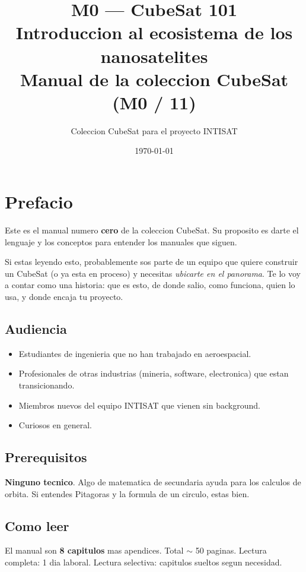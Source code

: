 \documentclass[11pt,a4paper,oneside,openright]{book}
\title{\Huge\bfseries M0 --- CubeSat 101\\[0.4em]
\Large Introduccion al ecosistema de los nanosatelites\\[0.6em]
\large Manual de la coleccion CubeSat (M0 / 11)}
\author{Coleccion CubeSat para el proyecto INTISAT}
\date{\today}
\begin{document}
\frontmatter
\maketitle

\chapter*{Prefacio}

Este es el manual numero \textbf{cero} de la coleccion CubeSat. Su
proposito es darte el lenguaje y los conceptos para entender los manuales
que siguen.

Si estas leyendo esto, probablemente sos parte de un equipo que quiere
construir un CubeSat (o ya esta en proceso) y necesitas \emph{ubicarte en
el panorama}. Te lo voy a contar como una historia: que es esto, de donde
salio, como funciona, quien lo usa, y donde encaja tu proyecto.

\section*{Audiencia}

\begin{itemize}[leftmargin=2em]
  \item Estudiantes de ingenieria que no han trabajado en aeroespacial.
  \item Profesionales de otras industrias (mineria, software, electronica)
        que estan transicionando.
  \item Miembros nuevos del equipo INTISAT que vienen sin background.
  \item Curiosos en general.
\end{itemize}

\section*{Prerequisitos}

\textbf{Ninguno tecnico}. Algo de matematica de secundaria ayuda para los
calculos de orbita. Si entendes Pitagoras y la formula de un circulo,
estas bien.

\section*{Como leer}

El manual son \textbf{8 capitulos} mas apendices. Total $\sim$ 50 paginas.
Lectura completa: 1 dia laboral. Lectura selectiva: capitulos sueltos
segun necesidad.
\end{document}

